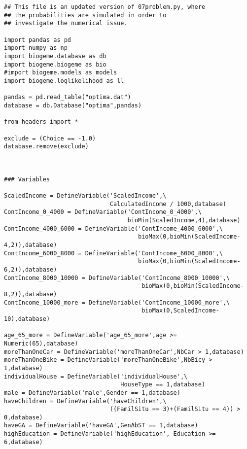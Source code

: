 \documentclass[12pt,a4paper]{article}
\begin{document}
\begin{lstlisting}[style=numbers]
## This file is an updated version of 07problem.py, where
## the probabilities are simulated in order to
## investigate the numerical issue. 

import pandas as pd
import numpy as np
import biogeme.database as db
import biogeme.biogeme as bio
#import biogeme.models as models
import biogeme.loglikelihood as ll

pandas = pd.read_table("optima.dat")
database = db.Database("optima",pandas)

from headers import *

exclude = (Choice == -1.0)
database.remove(exclude)



### Variables

ScaledIncome = DefineVariable('ScaledIncome',\
                              CalculatedIncome / 1000,database)
ContIncome_0_4000 = DefineVariable('ContIncome_0_4000',\
                                   bioMin(ScaledIncome,4),database)
ContIncome_4000_6000 = DefineVariable('ContIncome_4000_6000',\
                                      bioMax(0,bioMin(ScaledIncome-4,2)),database)
ContIncome_6000_8000 = DefineVariable('ContIncome_6000_8000',\
                                      bioMax(0,bioMin(ScaledIncome-6,2)),database)
ContIncome_8000_10000 = DefineVariable('ContIncome_8000_10000',\
                                       bioMax(0,bioMin(ScaledIncome-8,2)),database)
ContIncome_10000_more = DefineVariable('ContIncome_10000_more',\
                                       bioMax(0,ScaledIncome-10),database)

age_65_more = DefineVariable('age_65_more',age >= Numeric(65),database)
moreThanOneCar = DefineVariable('moreThanOneCar',NbCar > 1,database)
moreThanOneBike = DefineVariable('moreThanOneBike',NbBicy > 1,database)
individualHouse = DefineVariable('individualHouse',\
                                 HouseType == 1,database)
male = DefineVariable('male',Gender == 1,database)
haveChildren = DefineVariable('haveChildren',\
                              ((FamilSitu == 3)+(FamilSitu == 4)) > 0,database)
haveGA = DefineVariable('haveGA',GenAbST == 1,database)
highEducation = DefineVariable('highEducation', Education >= 6,database)


\end{lstlisting}
\end{document}
